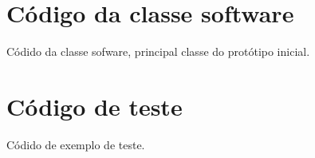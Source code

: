 \begin{apendicesenv}
\partapendices

\chapter{Código da classe software}
\label{apendice1}

Códido da classe sofware, principal classe do protótipo inicial.




\chapter{Código de teste}
\label{apendice2}

Códido de exemplo de teste.



\end{apendicesenv}
